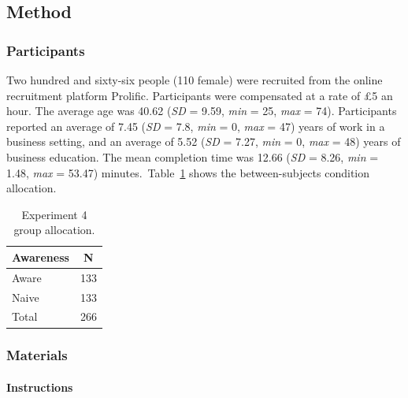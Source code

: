 \documentclass[a4paper, nobind, dvipsnames]{templates/ociamthesis}
\theoremstyle{definition}
\theoremstyle{definition}
\theoremstyle{definition}
\theoremstyle{definition}
\theoremstyle{remark}
\begin{document}
\subsection{Method}

\subsubsection{Participants}

Two hundred and sixty-six people (110 female) were recruited from the online recruitment platform Prolific. Participants were compensated at a rate of £5 an hour. The average age was 40.62 (\emph{SD} = 9.59, \emph{min} = 25, \emph{max} = 74). Participants reported an average of 7.45 (\emph{SD} = 7.8, \emph{min} = 0, \emph{max} = 47) years of work in a business setting, and an average of 5.52 (\emph{SD} = 7.27, \emph{min} = 0, \emph{max} = 48) years of business education. The mean completion time was 12.66 (\emph{SD} = 8.26, \emph{min} = 1.48, \emph{max} = 53.47) minutes.~Table~\ref{tab:condition-allocation-aggregation-4}
shows the between-subjects condition allocation.

\begin{table}[tbp]

\begin{center}
\begin{threeparttable}

\caption{\label{tab:condition-allocation-aggregation-4}Experiment 4 group allocation.}

\begin{tabular}{ll}
\toprule
Awareness & \multicolumn{1}{c}{N}\\
\midrule
Aware & 133\\
Naive & 133\\
Total & 266\\
\bottomrule
\end{tabular}

\end{threeparttable}
\end{center}

\end{table}

\subsubsection{Materials}

\paragraph{Instructions}
\end{document}
